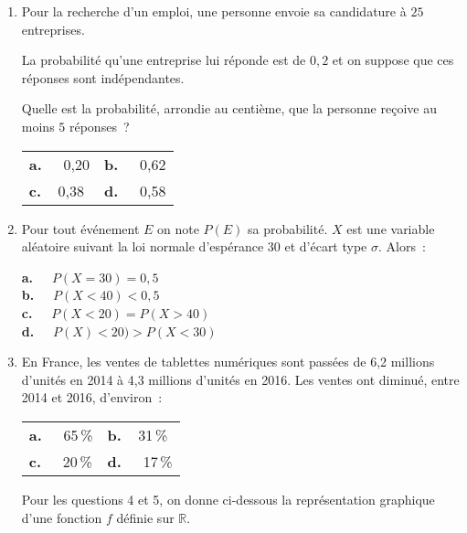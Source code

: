 \begin{enumerate}
     \item Pour la recherche d'un emploi, une personne envoie sa candidature à $25$ entreprises.
     \par
     La probabilité qu'une entreprise lui réponde est de $0,2$ et on suppose que ces réponses
     sont indépendantes.
     \par
     Quelle est la probabilité, arrondie au centième, que la personne reçoive au moins $5$
     réponses~?

     \begin{tabularx}{\linewidth}{*{2}{X}}%
          \textbf{a.~~} 0,20 &\textbf{b.~~} 0,62\\
          \textbf{c.~~}0,38  &\textbf{d.~~} 0,58
     \end{tabularx}
     \medbreak
     \item Pour tout événement $E$ on note $P(E)$ sa probabilité. $X$ est une variable aléatoire suivant la loi normale d'espérance $30$ et d'écart type $\sigma$. Alors~:
\par   
     \textbf{a.~~} $P(X = 30) = 0,5$ \\
     \textbf{b.~~} $P(X < 40 ) < 0,5$\\
     \textbf{c.~~} $P(X < 20) = P(X > 40)$\\
     \textbf{d.~~} $P(X) < 20) > P(X < 30)$\\
     \medbreak
     \item En France, les ventes de tablettes numériques sont passées de 6,2 millions d'unités en 2014 à 4,3 millions d'unités en 2016. Les ventes ont diminué, entre 2014 et 2016,
     d'environ~:
\par
     \begin{tabularx}{\linewidth}{*{2}{X}}%
          \textbf{a.~~} 65\,\%&\textbf{b.~~}31\,\% \\
          \textbf{c.~~} 20\,\%&\textbf{d.~~}  17\,\%
     \end{tabularx}
     \medbreak
     Pour les questions 4 et 5, on donne ci-dessous
     la représentation graphique d'une
     fonction $f$ définie sur $\mathbb{R}$.
     \medbreak
     \begin{center}
          \begin{extern}%
\end{extern}
\end{center}
\end{enumerate}
